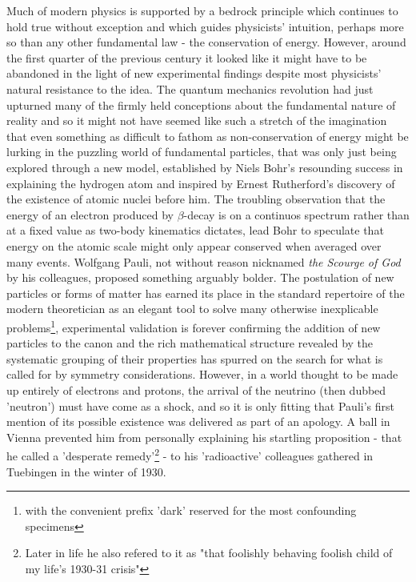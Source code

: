 Much of modern physics is supported by a bedrock principle which continues to hold true without exception and which guides physicists' intuition, perhaps more so than any other fundamental law - the conservation of energy. However, around the first quarter of the previous century it looked like it might have to be abandoned in the light of new experimental findings despite most physicists' natural resistance to the idea. The quantum mechanics revolution had just upturned many of the firmly held conceptions about the fundamental nature of reality and so it might not have seemed like such a stretch of the imagination that even something as difficult to fathom as non-conservation of energy might be lurking in the puzzling world of fundamental particles, that was only just being explored through a new model, established by Niels Bohr's resounding success in explaining the hydrogen atom and inspired by Ernest Rutherford's discovery of the existence of atomic nuclei before him. The troubling observation that the energy of an electron produced by $\beta$-decay is on a continuos spectrum rather than at a fixed value as two-body kinematics dictates, lead Bohr to speculate that energy on the atomic scale might only appear conserved when averaged over many events. Wolfgang Pauli, not without reason nicknamed \textit{the Scourge of God} by his colleagues\cite{Faust}, proposed something arguably bolder. The postulation of new particles or forms of matter has earned its place in the standard repertoire of the modern theoretician as an elegant tool to solve many otherwise inexplicable problems\footnote{with the convenient prefix 'dark' reserved for the most confounding specimens}, experimental validation is forever confirming the addition of new particles to the canon and the rich mathematical structure revealed by the systematic grouping of their properties has spurred on the search for what is called for by symmetry considerations. However, in a world thought to be made up entirely of electrons and protons, the arrival of the neutrino (then dubbed 'neutron') must have come as a shock, and so it is only fitting that Pauli's first mention of its possible existence was delivered as part of an apology. A ball in Vienna prevented him from personally explaining his startling proposition - that he called a 'desperate remedy'\footnote{Later in life he also refered to it as "that foolishly behaving foolish child of my life's 1930-31 crisis"} - to his 'radioactive' colleagues gathered in Tuebingen in the winter of 1930.     